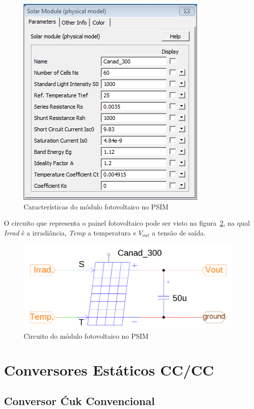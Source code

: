 \documentclass[
	12pt,				%
	openany,
	onseside,
	a4paper,			%
	english,			%
	french,				%
	spanish,			%
	brazil,				%
	]{abntex2}
\begin{document}
\begin{figure}[htbp]%
	\begin{center}%
		\includegraphics[width=0.55 \linewidth]{PV_carac}
		\caption{Características do módulo fotovoltaico no PSIM}
		\label{fig:pv_psim_carac}
	\end{center}
\end{figure}

O circuito que representa o painel fotovoltaico pode ser visto na figura~\ref{fig:pv_psim_circuit}, na qual \textit{Irrad} é a irradiância, \textit{Temp} a temperatura e $V_{out}$ a tensão de saída.

\begin{figure}[htbp]%
	\begin{center}%
		\includegraphics[width=0.65 \linewidth]{pv_psim_circuit}
		\caption{Circuito do módulo fotovoltaico no PSIM}
		\label{fig:pv_psim_circuit}
	\end{center}
\end{figure}


\section{Conversores Estáticos CC/CC} \label{sec:met_conv_cc}

\subsection{Conversor Ćuk Convencional}
\end{document}
